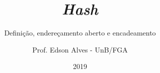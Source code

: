 \title{\textit{Hash}}
\subtitle{Definição, endereçamento aberto e encadeamento}
\author{Prof. Edson Alves - UnB/FGA}
\date{2019}
